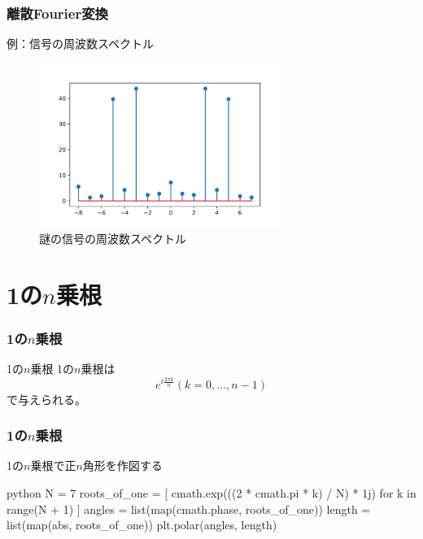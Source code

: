 \documentclass[dvipdfmx,11pt,notheorems]{beamer}
\theoremstyle{definition}
\begin{document}
\begin{frame}[fragile]\frametitle{離散Fourier変換}

\begin{block}{例：信号の周波数スペクトル}
\begin{figure}
  \centering
  \includegraphics[width=8cm]{stem.png}
  \caption{謎の信号の周波数スペクトル}
\end{figure}

\end{block}
\end{frame}

\section{1の$n$乗根}

\begin{frame}[fragile]\frametitle{1の$n$乗根}

\begin{block}{1の$n$乗根}
1の$n$乗根は
\begin{equation*}
e^{i \frac{2\pi k}{n}}(k=0, \dots , n-1)
\end{equation*}
で与えられる。
\end{block}

\end{frame}

\begin{frame}[fragile]\frametitle{1の$n$乗根}
\begin{exampleblock}{1の$n$乗根で正$n$角形を作図する}
\begin{pygments}{python}
N = 7
roots_of_one = [
    cmath.exp(((2 * cmath.pi * k) / N) * 1j) 
    for k in range(N + 1)
]
angles = list(map(cmath.phase, roots_of_one))
length = list(map(abs, roots_of_one))
plt.polar(angles, length)
\end{pygments}
\end{exampleblock}

\end{frame}
\end{document}
